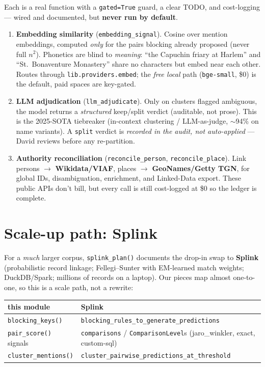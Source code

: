 \documentclass[11pt]{article}
\newcommand{\code}[1]{\texttt{#1}}
\begin{document}
Each is a real function with a \code{gated=True} guard, a clear TODO, and
cost-logging --- wired and documented, but \textbf{never run by default}.

\begin{enumerate}[leftmargin=*]
  \item \textbf{Embedding similarity} (\code{embedding\_signal}). Cosine over mention
        embeddings, computed \emph{only} for the pairs blocking already proposed
        (never full $n^2$). Phonetics are blind to \emph{meaning}: ``the Capuchin
        friary at Harlem'' and ``St.\ Bonaventure Monastery'' share no characters
        but embed near each other. Routes through \code{lib.providers.embed}; the
        \emph{free local} path (\code{bge-small}, \$0) is the default, paid spaces
        are key-gated.
  \item \textbf{LLM adjudication} (\code{llm\_adjudicate}). Only on clusters flagged
        ambiguous, the model returns a \emph{structured} keep/split verdict
        (auditable, not prose). This is the 2025-SOTA tiebreaker (in-context
        clustering / LLM-as-judge, $\sim$94\% on name variants). A \code{split}
        verdict is \emph{recorded in the audit, not auto-applied} --- David reviews
        before any re-partition.
  \item \textbf{Authority reconciliation} (\code{reconcile\_person},
        \code{reconcile\_place}). Link persons $\to$ \textbf{Wikidata/VIAF}, places
        $\to$ \textbf{GeoNames/Getty TGN}, for global IDs, disambiguation,
        enrichment, and Linked-Data export. These public APIs don't bill, but every
        call is still cost-logged at \$0 so the ledger is complete.
\end{enumerate}

\section{Scale-up path: Splink}

For a \emph{much} larger corpus, \code{splink\_plan()} documents the drop-in swap to
\textbf{Splink} (probabilistic record linkage; Fellegi--Sunter with EM-learned match
weights; DuckDB/Spark; millions of records on a laptop). Our pieces map almost
one-to-one, so this is a scale path, not a rewrite:

\begin{center}
\small
\begin{tabular}{ll}
\toprule
this module & Splink \\
\midrule
\code{blocking\_keys()}     & \code{blocking\_rules\_to\_generate\_predictions} \\
\code{pair\_score()} signals & \code{comparisons} / \code{ComparisonLevel}s (jaro\_winkler, exact, custom-sql) \\
\code{cluster\_mentions()}  & \code{cluster\_pairwise\_predictions\_at\_threshold} \\
\bottomrule
\end{tabular}
\end{center}
\end{document}
